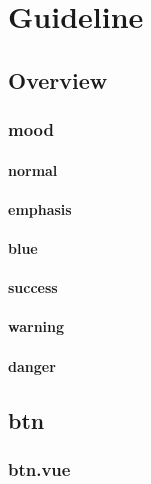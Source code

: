 \part{Guideline}


\chapter{Overview}



\section{mood}


\subsection{normal}


\subsection{emphasis}


\subsection{blue}


\subsection{success}




\subsection{warning}



\subsection{danger}

\chapter{btn}


\section{btn.vue}


